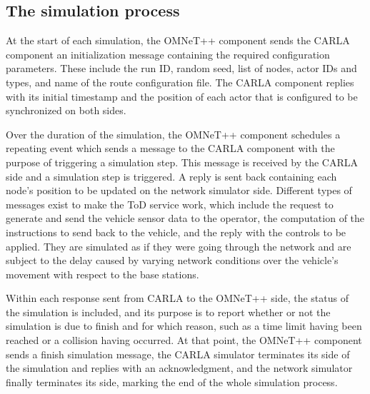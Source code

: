 \subsection{The simulation process}

At the start of each simulation, the OMNeT++ component sends the CARLA component an initialization message containing the required configuration parameters. These include the run ID, random seed, list of nodes, actor IDs and types, and name of the route configuration file. The CARLA component replies with its initial timestamp and the position of each actor that is configured to be synchronized on both sides.

Over the duration of the simulation, the OMNeT++ component schedules a repeating event which sends a message to the CARLA component with the purpose of triggering a simulation step. This message is received by the CARLA side and a simulation step is triggered. A reply is sent back containing each node's position to be updated on the network simulator side.
Different types of messages exist to make the ToD service work, which include the request to generate and send the vehicle sensor data to the operator, the computation of the instructions to send back to the vehicle, and the reply with the controls to be applied. They are simulated as if they were going through the network and are subject to the delay caused by varying network conditions over the vehicle's movement with respect to the base stations.

Within each response sent from CARLA to the OMNeT++ side, the status of the simulation is included, and its purpose is to report whether or not the simulation is due to finish and for which reason, such as a time limit having been reached or a collision having occurred. At that point, the OMNeT++ component sends a finish simulation message, the CARLA simulator terminates its side of the simulation and replies with an acknowledgment, and the network simulator finally terminates its side, marking the end of the whole simulation process.


